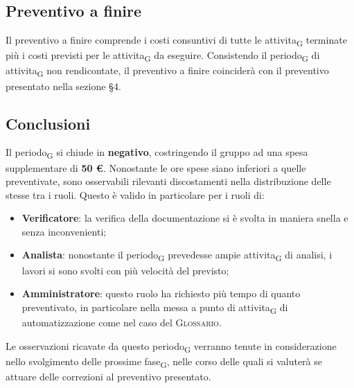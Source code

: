 \subsection{Preventivo a finire}
Il preventivo a finire comprende i costi consuntivi di tutte le attivita\textsubscript{G} terminate più i costi previsti per le attivita\textsubscript{G} da eseguire. Consistendo il periodo\textsubscript{G} di attivita\textsubscript{G} non rendicontate, il preventivo a finire coinciderà con il preventivo presentato nella sezione \S 4.



\subsection{Conclusioni}

Il periodo\textsubscript{G} si chiude in \textbf{negativo}, costringendo il gruppo ad una spesa supplementare di \textbf{50 \euro{}}. Nonostante le ore spese siano inferiori a quelle preventivate, sono osservabili rilevanti discostamenti nella distribuzione delle stesse tra i ruoli. Questo è valido in particolare per i ruoli di:
\begin{itemize}
	\item \textbf{Verificatore}: la verifica della documentazione si è svolta in maniera snella e senza inconvenienti;
	\item \textbf{Analista}: nonostante il periodo\textsubscript{G} prevedesse ampie attivita\textsubscript{G} di analisi, i lavori si sono svolti con più velocità del previsto;
	\item \textbf{Amministratore}: questo ruolo ha richiesto più tempo di quanto preventivato, in particolare nella messa a punto di attivita\textsubscript{G} di automatizzazione come nel caso del \textsc{Glossario}.
\end{itemize}
Le osservazioni ricavate da questo periodo\textsubscript{G} verranno tenute in considerazione nello svolgimento delle prossime fase\textsubscript{G}, nelle corso delle quali si valuterà se attuare delle correzioni al preventivo presentato.
